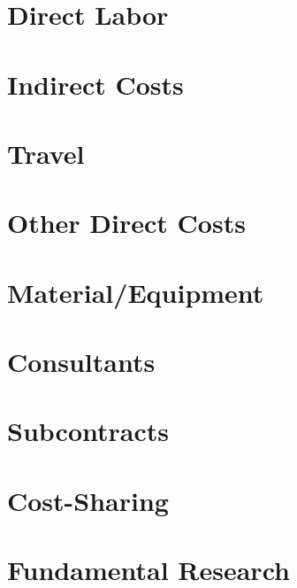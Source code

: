 \section{Direct Labor}
\section{Indirect Costs}
\section{Travel}
\section{Other Direct Costs}
\section{Material/Equipment}
\section{Consultants}
\section{Subcontracts}
\section{Cost-Sharing}
\section{Fundamental Research}
